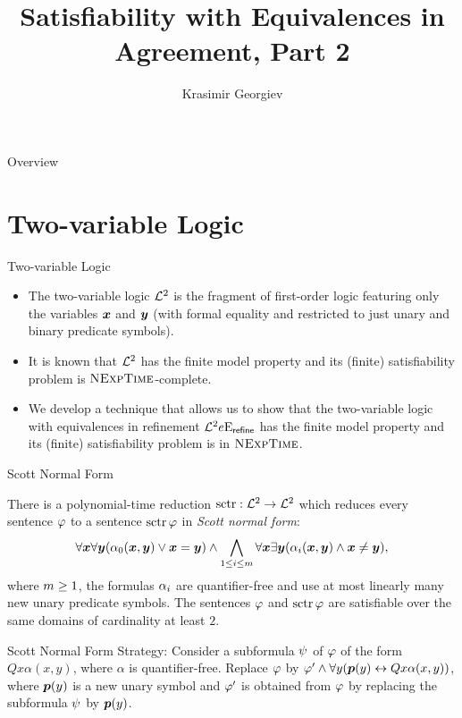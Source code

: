 \documentclass{beamer}
\begin{document}
\title{Satisfiability with Equivalences in Agreement, Part 2}
\author{Krasimir Georgiev}
\frame{\titlepage}

\begin{frame}{Overview}
\tableofcontents
\end{frame}

\section{Two-variable Logic}
\begin{frame}{Two-variable Logic}
\begin{itemize}
  \item 
  The two-variable logic $\mathcal{L}^{2}$ is the fragment of first-order logic featuring
  only the variables $\bm{x}$ and $\bm{y}$ (with formal equality and restricted to just
  unary and binary predicate symbols).

  \item
  It is known that $\mathcal{L}^{2}$ has the finite model property and its (finite)
  satisfiability problem is $\text{\normalfont{\scshape NExpTime}}$-complete.
  
  \item We develop a technique that allows us to show that the two-variable
  logic with equivalences in refinement $\mathcal{L}^{2}{e}\mathrm{E}_{\mathsf{refine}}$ has the finite
  model property and its (finite) satisfiability problem is in $\text{\normalfont{\scshape NExpTime}}$.
\end{itemize}
\end{frame}
\begin{frame}{Scott Normal Form}
\begin{theorem}[Scott]
There is a polynomial-time reduction $\operatorname{sctr}: \mathcal{L}^{2} \to \mathcal{L}^{2}$ which reduces
every sentence $\varphi$ to a sentence $\operatorname{sctr}\varphi$ in \emph{Scott normal form}:
\[
  \forall\bm{x}\forall\bm{y}(\alpha_{0}(\bm{x},\bm{y}) \lor \bm{x} = \bm{y}) \land
  \bigwedge_{1 \leq i \leq m} \forall\bm{x}\exists\bm{y}
  (\alpha_{i}(\bm{x},\bm{y}) \land \bm{x} \neq \bm{y}),
\]
where $m\geq1$, the formulas $\alpha_{i}$ are quantifier-free and use at most
linearly many new unary predicate symbols.
The sentences $\varphi$ and $\operatorname{sctr}\varphi$ are satisfiable over the same domains of
cardinality at least $2$.
\end{theorem}
\end{frame}

\begin{frame}{Scott Normal Form}
Strategy: Consider a subformula $\psi$ of $\varphi$ of the form $Q x
\alpha(x,y)$, where $\alpha$ is quantifier-free.
Replace $\varphi$ by $\varphi' \land \forall y(\bm{p}(y)\leftrightarrow Q x \alpha(x,y))$,
where $\bm{p}(y)$ is a new unary symbol and $\varphi'$ is obtained from $\varphi$ by
replacing the subformula $\psi$ by $\bm{p}(y)$.
\end{frame}
\end{document}
